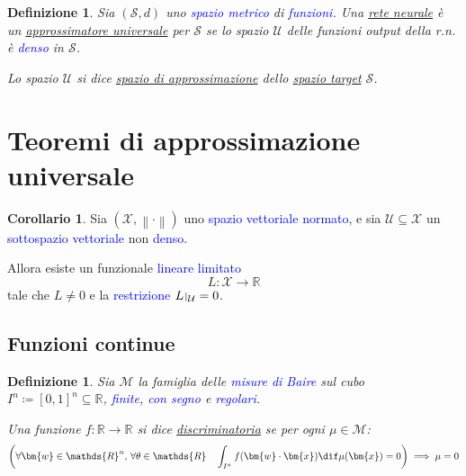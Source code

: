\documentclass[10pt]{book}
\newcommand{\1}{\mathds{1}}
\newcommand{\R}{\mathds{R}}
\newcommand{\norma}[1]{%
\left\lVert#1\right\rVert%
}
\let\restriction\relax
\def\restriction#1#2{\mathchoice
              {\setbox1\hbox{${\displaystyle #1}_{\scriptstyle #2}$}
              \restrictionaux{#1}{#2}}
              {\setbox1\hbox{${\textstyle #1}_{\scriptstyle #2}$}
              \restrictionaux{#1}{#2}}
              {\setbox1\hbox{${\scriptstyle #1}_{\scriptscriptstyle #2}$}
              \restrictionaux{#1}{#2}}
              {\setbox1\hbox{${\scriptscriptstyle #1}_{\scriptscriptstyle #2}$}
              \restrictionaux{#1}{#2}}}
\def\restrictionaux#1#2{{#1\,\smash{\vrule height .8\ht1 depth .85\dp1}}_{\,#2}}
\theoremstyle{definition}%
\newtheorem{cor}[thm]{Corollario}
\theoremstyle{plain}
\newtheorem{definizione}[thm]{Definizione}
\theoremstyle{remark}
\renewcommand{\href}[2]{\textcolor{blue}{#2}}
\begin{document}
\begin{definizione}
Sia \((\mathcal{S}, d)\) uno \href{../../../../../org/roam/20250301193511-spazio_metrico.org}{spazio metrico} di \href{../../../../../org/roam/20250202170607-classe_relazione_binaria.org}{funzioni}. Una \hyperref[sec:orgbb3f8c2]{rete neurale} è un \uline{approssimatore universale} per \(\mathcal{S}\) se lo spazio \(\mathcal{U}\) delle funzioni output della r.n. è \href{../../../../../org/roam/20250301193045-sottoinsieme_denso.org}{denso} in \(\mathcal{S}\).

Lo spazio \(\mathcal{U}\) si dice \uline{spazio di approssimazione} dello \uline{spazio target} \(\mathcal{S}\).
\end{definizione}
\section{Teoremi di approssimazione universale}
\label{sec:org7931fe3}

\begin{cor}
Sia \((\mathcal{X}, \norma{\cdot})\) uno \href{../../../../../org/roam/20241205142027-spazio_vettoriale.org}{spazio vettoriale} \href{../../../../../org/roam/20250625123506-spazio_normato.org}{normato}, e sia \(\mathcal{U} \subseteq \mathcal{X}\) un \href{../../../../../org/roam/20250114103118-sottospazio_vettoriale.org}{sottospazio vettoriale} non \href{../../../../../org/roam/20250301193045-sottoinsieme_denso.org}{denso}.

Allora esiste un funzionale \href{../../../../../org/roam/20250114101949-funzione_lineare.org}{lineare} \href{../../../../../org/roam/20250704145518-funzione_limitata.org}{limitato}
\begin{equation*}
L:\mathcal{X}\to \R
\end{equation*}
tale che \(L\neq 0\) e la \href{../../../../../org/roam/20250205170515-restrizione_di_una_classe.org}{restrizione} \(\restriction{L}{\mathcal{U}} = 0\).
\label{lem:9.3.2}
\end{cor}
\subsection{Funzioni continue}
\label{sec:org79b9583}

\begin{definizione}
Sia \(\mathcal{M}\) la famiglia delle \href{../../../../../org/roam/20250625104200-misura_di_baire.org}{misure di Baire} sul cubo \(I^{n} \coloneqq [0,1]^{n} \subseteq \R\), \href{../../../../../org/roam/20250625110016-misura_finita.org}{finite}, \href{../../../../../org/roam/20250625110024-misura_con_segno.org}{con segno} e \href{../../../../../org/roam/20250625110032-misura_regolare.org}{regolari}.

Una funzione \(f: \R\to \R\) si dice \uline{discriminatoria} se per ogni \(\mu \in \mathcal{M}\):
\begin{equation*}
\left(\forall \bm{w} \in \R^{n},\, \forall \theta \in \R\quad \int_{I^{n}} f(\bm{w}\cdot\bm{x}) \dif \mu(\bm{x}) = 0\right)\implies \mu=0
\end{equation*}
\end{definizione}
\end{document}
